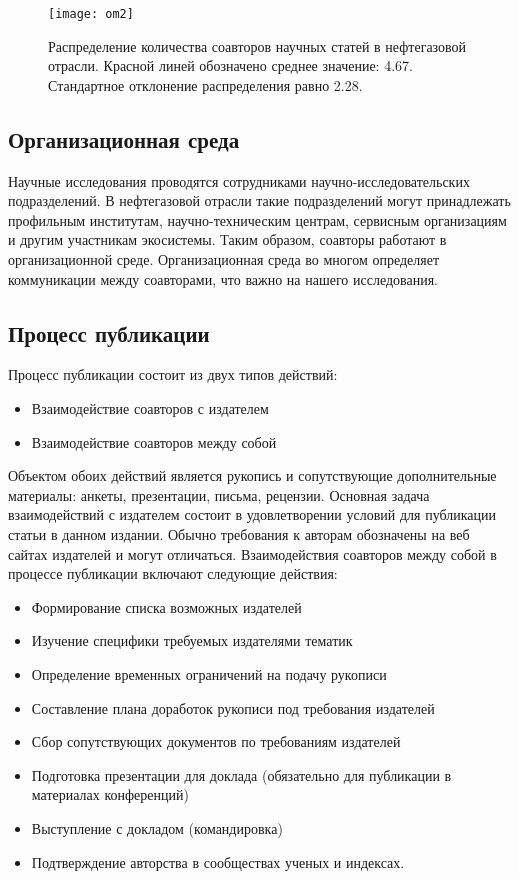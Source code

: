 \begin{figure}[H]
  \centering
  \texttt{[image: om2]}
  \label{fig:om2}
  \caption{Распределение количества соавторов научных статей в нефтегазовой отрасли. Красной линей обозначено среднее значение: 4.67. Стандартное отклонение распределения равно 2.28.}
\end{figure}  

\subsection{Организационная среда}
Научные исследования проводятся сотрудниками научно-исследовательских подразделений. 
В нефтегазовой отрасли такие подразделений могут принадлежать профильным институтам, научно-техническим центрам, сервисным организациям и другим участникам экосистемы. 
Таким образом, соавторы работают в организационной среде. 
Организационная среда во многом определяет коммуникации между соавторами, что важно на нашего исследования.

\subsection{Процесс публикации}
Процесс публикации состоит из двух типов действий: 
\begin{itemize}
\tightlist
\item Взаимодействие соавторов с издателем
\item Взаимодействие соавторов между собой
\end{itemize}

Объектом обоих действий является рукопись и сопутствующие дополнительные материалы: анкеты, презентации, письма, рецензии.
Основная задача взаимодействий с издателем состоит в удовлетворении условий для публикации статьи в данном издании. 
Обычно требования к авторам обозначены на веб сайтах издателей и могут отличаться.  
Взаимодействия соавторов между собой в процессе публикации включают следующие действия: 
\begin{itemize}
\tightlist
\item Формирование списка возможных издателей
\item Изучение специфики требуемых издателями тематик 
\item Определение временных ограничений на подачу рукописи
\item Составление плана доработок рукописи под требования издателей
\item Сбор сопутствующих документов по требованиям издателей
\item Подготовка презентации для доклада (обязательно для публикации в материалах конференций)
\item Выступление с докладом (командировка)
\item Подтверждение авторства в сообществах ученых и индексах.
\end{itemize}

